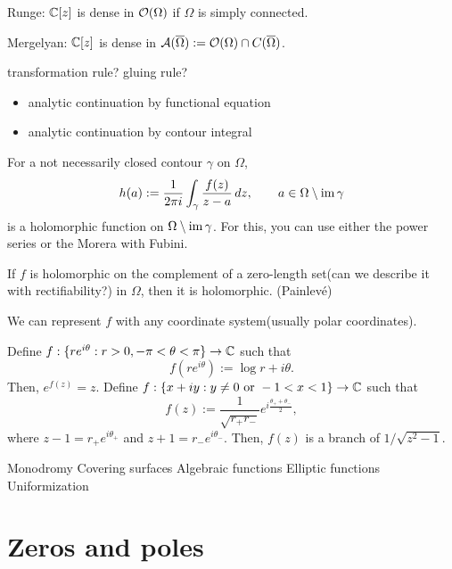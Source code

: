 \documentclass{../../large}
\begin{document}
Runge: $\mathbb{C}[z]$ is dense in $\mathcal{O}(\Omega)$ if $\Omega$ is simply connected.

Mergelyan: $\mathbb{C}[z]$ is dense in $\mathcal{A}(\overline\Omega):=\mathcal{O}(\Omega)\cap C(\overline\Omega)$.

transformation rule? gluing rule?

\begin{prb}

\end{prb}

\begin{itemize}
\item analytic continuation by functional equation
\item analytic continuation by contour integral
\end{itemize}

\begin{prb}
For a not necessarily closed contour $\gamma$ on $\Omega$,
\[h(a):=\frac1{2\pi i}\int_\gamma\frac{f(z)}{z-a}\,dz,\qquad a\in\Omega\setminus\operatorname{im}\gamma\]
is a holomorphic function on $\Omega\setminus\operatorname{im}\gamma$.
For this, you can use either the power series or the Morera with Fubini.

If $f$ is holomorphic on the complement of a zero-length set(can we describe it with rectifiability?) in $\Omega$, then it is holomorphic. (Painlev\'e)
\end{prb}



\begin{prb}
We can represent $f$ with any coordinate system(usually polar coordinates).

Define $f:\{re^{i\theta}:r>0,-\pi<\theta<\pi\}\to\mathbb{C}$ such that
\[f(re^{i\theta}):=\log r+i\theta.\]
Then, $e^{f(z)}=z$.
Define $f:\{x+iy:y\ne0\text{ or }-1<x<1\}\to\mathbb{C}$ such that
\[f(z):=\frac1{\sqrt{r_+r_-}}e^{i\frac{\theta_++\theta_-}2},\]
where $z-1=r_+e^{i\theta_+}$ and $z+1=r_-e^{i\theta_-}$.
Then, $f(z)$ is a branch of $1/\sqrt{z^2-1}$.
\end{prb}

Monodromy
Covering surfaces
Algebraic functions
Elliptic functions
Uniformization







\chapter{Zeros and poles}
\end{document}
